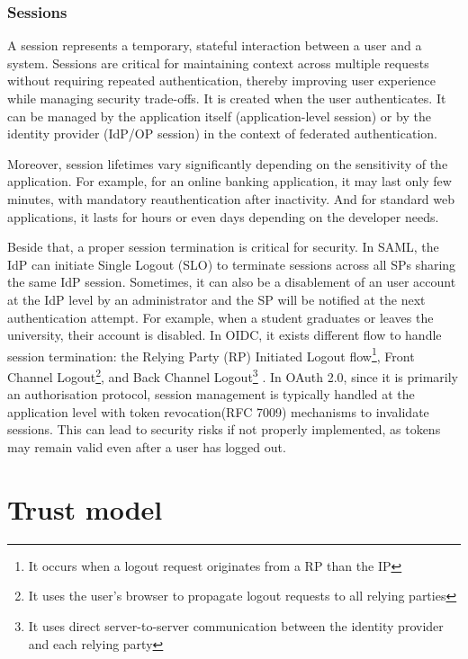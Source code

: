\documentclass[../memoire.tex]{subfiles}
\begin{document}
\subsubsection{Sessions}

A session represents a temporary, stateful interaction between a user and a system. Sessions are critical for maintaining context across multiple requests without requiring repeated authentication, thereby improving user experience while managing security trade-offs. It is created when the user authenticates. It can be managed by the application itself (application-level session) or by the identity provider (IdP/OP session) in the context of federated authentication.

Moreover, session lifetimes vary significantly depending on the sensitivity of the application. For example, for an online banking application, it may last only few minutes, with mandatory reauthentication after inactivity. And for standard web applications, it lasts for hours or even days depending on the developer needs. 

Beside that, a proper session termination is critical for security. In SAML, the IdP can initiate Single Logout (SLO) to terminate sessions across all SPs sharing the same IdP session. Sometimes, it can also be a disablement of an user account at the IdP level by an administrator and the SP will be notified at the next authentication attempt\cite[p.~229]{wilson2022}. For example, when a student graduates or leaves the university, their account is disabled. In OIDC, it exists different flow to handle session termination: the Relying Party (RP) Initiated Logout flow\footnote{It occurs when a logout request originates from a RP than the IP}, Front Channel Logout\footnote{It uses the user's browser to propagate logout requests to all relying parties}, and Back Channel Logout\footnote{It uses direct server-to-server communication between the identity provider and each relying party} \cite{ibmOauth2}. In OAuth 2.0, since it is primarily an authorisation protocol, session management is typically handled at the application level with token revocation(RFC 7009) mechanisms to invalidate sessions. This can lead to security risks if not properly implemented, as tokens may remain valid even after a user has logged out.

\section{Trust model} \label{sec_deux}
\end{document}
